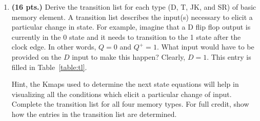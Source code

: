 \begin{enumerate}
\item \textbf{ (16 pts.)} Derive the transition list for each
type (D, T, JK, and SR) of basic memory element.  A transition 
list describes the input(s) necessary to elicit a particular 
change in state.  For example, imagine that a D flip flop output
is currently in the 0 state and it needs to transition to 
the 1 state after the clock edge.  In other words, $Q=0$ and 
$Q^+ = 1$.  What input would have to be provided on the
$D$ input to make this happen?  Clearly, $D=1$.  This entry
is filled in Table~\ref{table:tl}.

Hint, the Kmaps used to determine the next state equations
will help in visualizing all the conditions which elicit 
a particular change of input.  Complete the transition list 
for all four memory types.  For full credit, show how the
entries in the transition list are determined.

\begin{table}[ht]
\end{table}
\end{enumerate}

